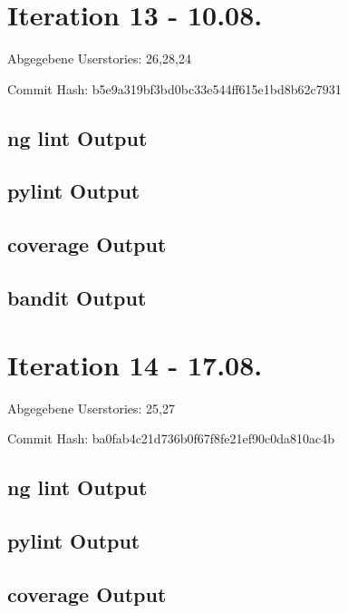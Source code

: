 \documentclass[accentcolor=tud0b,12pt,paper=a4]{tudreport}
\begin{document}
\section*{Iteration 13 - 10.08.}
Abgegebene Userstories: 26,28,24

	Commit Hash: b5e9a319bf3bd0bc33e544ff615e1bd8b62c7931
	
	\subsection*{ng lint Output}
	
	
	\subsection*{pylint Output}
	
	
	\subsection*{coverage Output}
	
	
	\subsection*{bandit Output}
	

\section*{Iteration 14 - 17.08.}
	Abgegebene Userstories: 25,27
	
	Commit Hash: ba0fab4c21d736b0f67f8fe21ef90c0da810ac4b
	
	\subsection*{ng lint Output}
	
	
	\subsection*{pylint Output}
	
	
	\subsection*{coverage Output}
	
	
\end{document}
